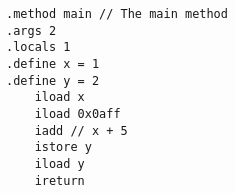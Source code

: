 \documentclass{article}
\begin{document}
  \begin{verbatim}
.method main // The main method
.args 2
.locals 1
.define x = 1
.define y = 2
    iload x
    iload 0x0aff
    iadd // x + 5
    istore y
    iload y
    ireturn
  \end{verbatim}
\end{document}
